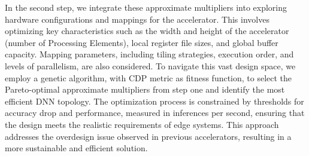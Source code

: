 In the second step, we integrate these approximate multipliers into exploring hardware configurations and mappings for the accelerator. This involves optimizing key characteristics such as the width and height of the accelerator (number of Processing Elements), local register file sizes, and global buffer capacity. Mapping parameters, including tiling strategies, execution order, and levels of parallelism, are also considered. 
To navigate this vast design space, we employ a genetic algorithm, with CDP metric as fitness function, to select the Pareto-optimal approximate multipliers from step one and identify the most efficient DNN topology. The optimization process is constrained by thresholds for accuracy drop and performance, measured in inferences per second, ensuring that the design meets the realistic requirements of edge systems. This approach addresses the overdesign issue observed in previous accelerators, resulting in a more sustainable and efficient solution.

